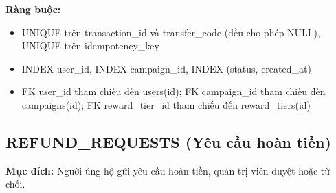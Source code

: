 \textbf{Ràng buộc:}
\begin{itemize}
    \item UNIQUE trên transaction\_\allowbreak{}id và transfer\_\allowbreak{}code (đều cho phép NULL), UNIQUE trên idempotency\_\allowbreak{}key
    \item INDEX user\_\allowbreak{}id, INDEX campaign\_\allowbreak{}id, INDEX (status, created\_\allowbreak{}at)
    \item FK user\_\allowbreak{}id tham chiếu đến users(id); FK campaign\_\allowbreak{}id tham chiếu đến campaigns(id); FK reward\_\allowbreak{}tier\_\allowbreak{}id tham chiếu đến reward\_\allowbreak{}tiers(id)
\end{itemize}

\subsection{REFUND\_\allowbreak{}REQUESTS (Yêu cầu hoàn tiền)}

\textbf{Mục đích:} Người ủng hộ gửi yêu cầu hoàn tiền, quản trị viên duyệt hoặc từ chối.

